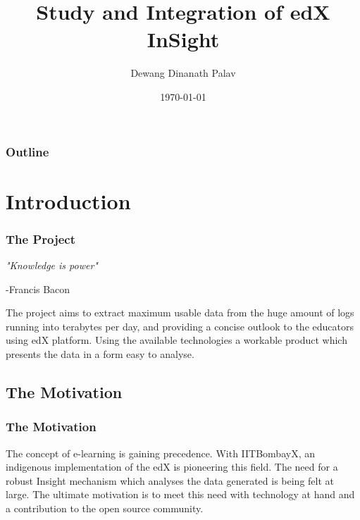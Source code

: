 \documentclass[12pt,xcolor=dvipsnames]{beamer}
\title{Study and Integration of edX InSight}
\author{Dewang Dinanath Palav}
\date{\today}
\begin{document}
\begin{frame}
\titlepage
\end{frame}


\begin{frame}
\frametitle{Outline}
\begin{multicols}{2}
\tableofcontents[hideallsubsections]
\end{multicols}
\end{frame}

\section{Introduction}
\begin{frame}[t]
\frametitle{The Project}
\begin{center}
\textit{\large "Knowledge is power"}
\end{center}
\begin{flushright}
-Francis Bacon  
\end{flushright}
\hspace{20pt} The project aims to extract maximum usable data from the huge amount of logs running into terabytes per day, and providing a concise outlook to the educators using edX platform. Using the available technologies a workable product which presents the data in a form easy to analyse. \\

\end{frame}


\subsection{The Motivation}
\begin{frame}[t]
\frametitle{The Motivation}
\hspace{20pt}The concept of e-learning is gaining precedence. With IITBombayX, an indigenous implementation of the edX is pioneering this field. The need for a robust Insight mechanism which analyses the data generated is being felt at large. The ultimate motivation is to meet this need with technology at hand and a contribution to the open source community.
\end{frame}
\end{document}
